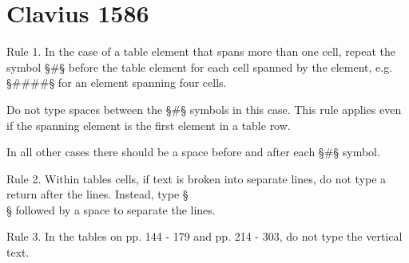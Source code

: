 \documentclass[fontsize=11pt, paper=a4, 
DIV15,
normalheadings,
parskip=half-, 
pointlessnumbers]{scrartcl}
\begin{document}
\section{Clavius 1586}

\begin{mainrule}
Rule 1. In the case of a table element that spans more than one cell, repeat the symbol §#§ before the table element for each cell spanned by the element, e.g. §####§ for an element spanning four cells. 
\end{mainrule}

\begin{clarification}
Do not type spaces between the §#§ symbols in this case. This rule applies even if the spanning element is the first element in a table row.
\end{clarification}

\begin{note}
In all other cases there should be a space before and after each §#§ symbol.
\end{note}

\vspace{3mm}
\begin{mainrule}
Rule 2. Within tables cells, if text is broken into separate lines, do not type a return after the lines. Instead, type §\\§ followed by a space to separate the lines.
\end{mainrule}

\begin{example}[: \, Clavius p. 11]

\vspace{-5mm}

\end{example}

\begin{mainrule}
Rule 3. In the tables on pp. 144 - 179 and pp. 214 - 303, do not type the vertical text.
\end{mainrule}
\end{document}
